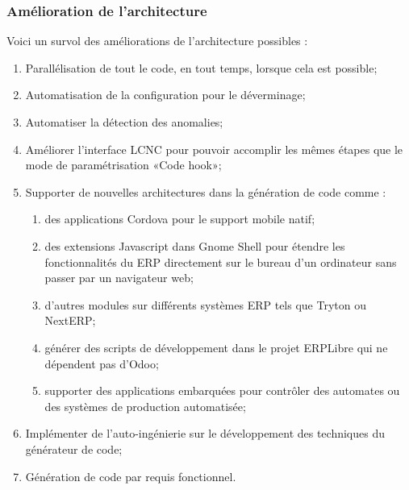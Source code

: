 \subsubsection{Amélioration de l’architecture}

Voici un survol des améliorations de l'architecture possibles :

\begin{enumerate}
    \item Parallélisation de tout le code, en tout temps, lorsque cela est possible;
    \item Automatisation de la configuration pour le déverminage;
    \item Automatiser la détection des anomalies;
    \item Améliorer l’interface LCNC pour pouvoir accomplir les mêmes étapes que le mode de paramétrisation «Code hook»;
    \item Supporter de nouvelles architectures dans la génération de code comme :
        \begin{enumerate}
        \item des applications Cordova pour le support mobile natif;
        \item des extensions Javascript dans Gnome Shell pour étendre les fonctionnalités du ERP directement sur le bureau d’un ordinateur sans passer par un navigateur web;
        \item d'autres modules sur différents systèmes ERP tels que Tryton ou NextERP;
        \item générer des scripts de développement dans le projet ERPLibre qui ne dépendent pas d’Odoo;
        \item supporter des applications embarquées pour contrôler des automates ou des systèmes de production automatisée;
        \end{enumerate}
    \item Implémenter de l'auto-ingénierie sur le développement des techniques du générateur de code;
    \item Génération de code par requis fonctionnel.
\end{enumerate}


